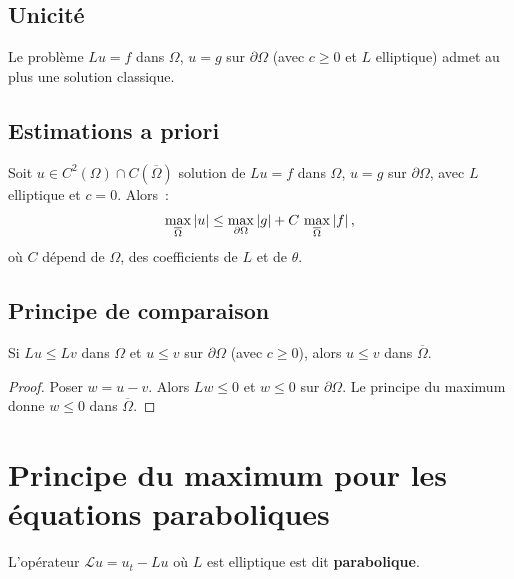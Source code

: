 \subsection{Unicit\'e}

\begin{corollaire}
Le probl\`eme $Lu = f$ dans $\Omega$, $u = g$ sur $\partial\Omega$
(avec $c \geq 0$ et $L$ elliptique) admet au plus une solution classique.
\end{corollaire}

\subsection{Estimations a priori}

\begin{theoreme}
Soit $u \in C^2(\Omega) \cap C(\overline{\Omega})$ solution de $Lu = f$
dans $\Omega$, $u = g$ sur $\partial\Omega$, avec $L$ elliptique et $c = 0$.
Alors~:
\begin{equation}\label{eq:estimation_a_priori}
    \max_{\overline{\Omega}} \left| u \right| \leq \max_{\partial\Omega} \left| g \right|
    + C\, \max_{\overline{\Omega}} \left| f \right|,
\end{equation}
o\`u $C$ d\'epend de $\Omega$, des coefficients de $L$ et de $\theta$.
\end{theoreme}

\subsection{Principe de comparaison}

\begin{theoreme}
Si $Lu \leq Lv$ dans $\Omega$ et $u \leq v$ sur $\partial\Omega$
(avec $c \geq 0$), alors $u \leq v$ dans $\overline{\Omega}$.
\end{theoreme}

\begin{proof}
Poser $w = u - v$. Alors $Lw \leq 0$ et $w \leq 0$ sur $\partial\Omega$.
Le principe du maximum donne $w \leq 0$ dans $\overline{\Omega}$.
\end{proof}

\section{Principe du maximum pour les \'equations paraboliques}

\begin{definition}
L'op\'erateur $\mathcal{L}u = u_t - Lu$ o\`u $L$ est elliptique est
dit \textbf{parabolique}.
\end{definition}

